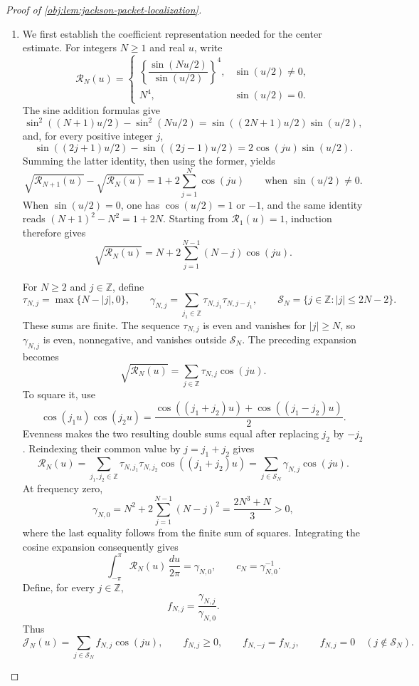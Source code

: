 \begin{proof}[Proof of \cref{obj:lem:jackson-packet-localization}]
\begin{enumerate}
\item We first establish the coefficient representation needed for the center estimate. For integers \(N\geq1\) and real \(u\), write
\[
\mathcal R_N(u)=
\begin{cases}
\left\{\dfrac{\sin(Nu/2)}{\sin(u/2)}\right\}^{4},
& \sin(u/2)\neq0,\\[1ex]
N^4,&\sin(u/2)=0.
\end{cases}
\]
The sine addition formulas give
\[
\sin^2((N+1)u/2)-\sin^2(Nu/2)
=\sin((2N+1)u/2)\sin(u/2),
\]
and, for every positive integer \(j\),
\[
\sin((2j+1)u/2)-\sin((2j-1)u/2)
=2\cos(ju)\sin(u/2).
\]
Summing the latter identity, then using the former, yields
\[
\sqrt{\mathcal R_{N+1}(u)}-\sqrt{\mathcal R_N(u)}
=1+2\sum_{j=1}^{N}\cos(ju)
\qquad\text{when }\sin(u/2)\neq0.
\]
When \(\sin(u/2)=0\), one has \(\cos(u/2)=1\) or \(-1\), and the same identity reads
\((N+1)^2-N^2=1+2N\). Starting from \(\mathcal R_1(u)=1\), induction therefore gives
\[
\sqrt{\mathcal R_N(u)}
=N+2\sum_{j=1}^{N-1}(N-j)\cos(ju).
\]

For \(N\geq2\) and \(j\in\mathbb Z\), define
\[
\tau_{N,j}=\max\{N-|j|,0\},\qquad
\gamma_{N,j}=\sum_{j_1\in\mathbb Z}
\tau_{N,j_1}\tau_{N,j-j_1},\qquad
\mathcal S_N=\{j\in\mathbb Z:|j|\leq2N-2\}.
\]
These sums are finite. The sequence \(\tau_{N,j}\) is even and vanishes for
\(|j|\geq N\), so \(\gamma_{N,j}\) is even, nonnegative, and vanishes outside
\(\mathcal S_N\). The preceding expansion becomes
\[
\sqrt{\mathcal R_N(u)}
=\sum_{j\in\mathbb Z}\tau_{N,j}\cos(ju).
\]
To square it, use
\[
\cos(j_1u)\cos(j_2u)
=\frac{\cos((j_1+j_2)u)+\cos((j_1-j_2)u)}2.
\]
Evenness makes the two resulting double sums equal after replacing
\(j_2\) by \(-j_2\). Reindexing their common value by \(j=j_1+j_2\) gives
\[
\mathcal R_N(u)
=\sum_{j_1,j_2\in\mathbb Z}
\tau_{N,j_1}\tau_{N,j_2}\cos((j_1+j_2)u)
=\sum_{j\in\mathcal S_N}\gamma_{N,j}\cos(ju).
\]
At frequency zero,
\[
\gamma_{N,0}
=N^2+2\sum_{j=1}^{N-1}(N-j)^2
=\frac{2N^3+N}{3}>0,
\]
where the last equality follows from the finite sum of squares. Integrating the cosine expansion consequently gives
\[
\int_{-\pi}^{\pi}\mathcal R_N(u)\,\frac{du}{2\pi}
=\gamma_{N,0},
\qquad
c_N=\gamma_{N,0}^{-1}.
\]
Define, for every \(j\in\mathbb Z\),
\[
f_{N,j}=\frac{\gamma_{N,j}}{\gamma_{N,0}}.
\]
Thus
\[
\mathcal J_N(u)=\sum_{j\in\mathcal S_N}f_{N,j}\cos(ju),
\qquad
f_{N,j}\geq0,\qquad
f_{N,-j}=f_{N,j},\qquad
f_{N,j}=0\quad(j\notin\mathcal S_N).
\]


\end{enumerate}
\end{proof}
